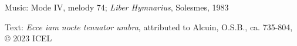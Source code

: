 \hymn



\medskip\begin{hymnsource}
Music: Mode IV, melody 74; \emph{Liber Hymnarius}, Solesmes, 1983

Text: \emph{Ecce iam nocte tenuator umbra}, attributed to Alcuin, O.S.B., ca. 735-804, © 2023 ICEL
\end{hymnsource}
